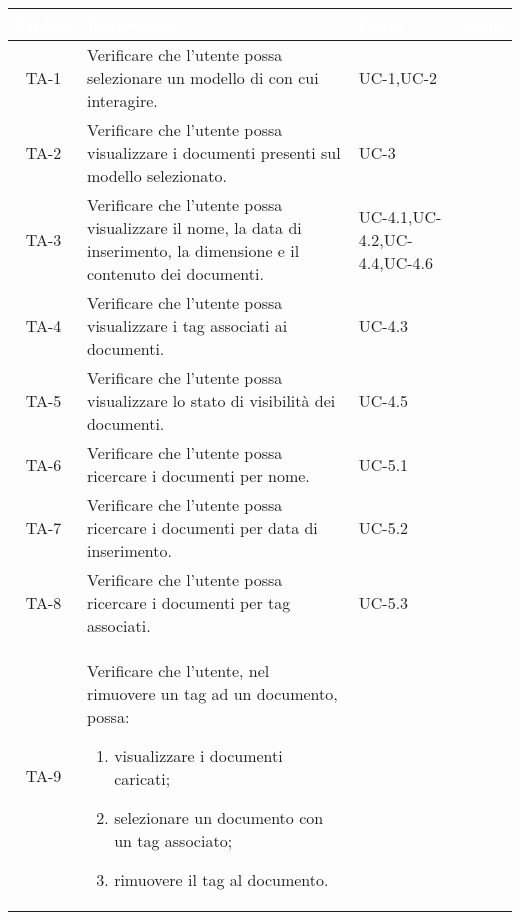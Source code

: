\begingroup
\setlength{\tabcolsep}{10pt}
\renewcommand{\arraystretch}{1.5}
\begin{xltabular}{\textwidth}{| c | X | X | c |}
    \hline
     \textbf{\textcolor{white}{Codice}} & \textbf{\textcolor{white}{Descrizione}} & \textbf{\textcolor{white}{Fonte}} & \textbf{\textcolor{white}{Stato}}\\
    \hline
    \endhead
    \hline
    TA-1 & Verificare che l’utente possa selezionare un modello di  con cui interagire. & UC-1,\newline UC-2 & \textcolor{cmarkcolor}{}  \\
    \hline
    TA-2 & Verificare che l’utente possa visualizzare i documenti presenti sul modello selezionato.
     & UC-3 &\textcolor{cmarkcolor}{}  \\
    \hline
    TA-3 & Verificare che l’utente possa visualizzare il nome,  la data di inserimento, la dimensione e il contenuto dei documenti.
     & UC-4.1,\newline UC-4.2,\newline UC-4.4,\newline UC-4.6 &\textcolor{cmarkcolor}{}  \\
    \hline
    TA-4 & Verificare che l’utente possa visualizzare i tag associati ai documenti.
     & UC-4.3 &\textcolor{cmarkcolor}{}  \\
    \hline
    TA-5 & Verificare che l’utente possa visualizzare lo stato di visibilità dei documenti.
     & UC-4.5 &\textcolor{cmarkcolor}{}  \\
    \hline
    TA-6 & Verificare che l’utente possa ricercare i documenti per nome. & UC-5.1 & \textcolor{cmarkcolor}{}  \\
    \hline
    TA-7 & Verificare che l’utente possa ricercare i documenti per data di inserimento. & UC-5.2 & \textcolor{cmarkcolor}{}  \\
    \hline
    TA-8 & Verificare che l’utente possa ricercare i documenti per tag associati. & UC-5.3 & \textcolor{xmarkcolor}{}  \\
    \hline
    TA-9 & Verificare che l’utente, nel rimuovere un tag ad un documento, possa:
    \begin{enumerate}
        \item visualizzare i documenti caricati;
        \item selezionare un documento con un tag associato;
        \item rimuovere il tag al documento.

\end{enumerate}
\end{xltabular}
